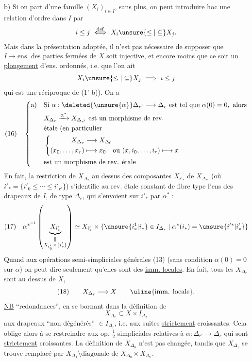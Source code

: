 b) Si on part d'une famille $(X_i)_{i\in I}$,  sans
plus, on peut introduire  hoc une relation
d'ordre dans $I$ par 
\[
i\leq j\ \overset{\mathrm{def}}{\Longleftrightarrow}\ X_i\unsure{\leq|\subseteq}X_j.
\]
Mais dans la présentation adoptée, il n'est pas
nécessaire de supposer que  $I\longrightarrow\text{ens. des parties}$
fermées de $X$ soit injective, et encore moins
que ce soit un \uline{plongement} d'ens. ordonnés,
i.e. que l'on ait
\[
X_i\unsure{\leq|\subseteq}X_j\ \Longrightarrow\ i\leq j
\]
qui est une réciproque de (1' b)).
On a
\[
(16)\quad\left\{\begin{aligned}
\text{a)}\quad&\text{Si }\alpha:\deleted{\unsure{\alpha}}\Delta_{r'}\longrightarrow\Delta_r\text{ est tel que }\alpha(0)=0,\text{ alors}\\
&X_{\Delta_r}\xrightarrow{\alpha^*}X_{\Delta_{r'}}\text{ est un morphisme de rev.}\\
&\text{étale (en particulier}\\
&\left\{\begin{aligned}
X_{\Delta_r}&\longrightarrow X_{\Delta_0}\\
(x_0,\ldots,x_r)&\longmapsto x_0\quad\text{ou }(x,i_0,\ldots,i_r)\longmapsto x
\end{aligned}\right.\\
&\text{est un morphisme de rev. étale}
\end{aligned}\right.
\]
En fait, la  restriction de $X_{\Delta_r}$ au
dessus des composantes $X_{i'_*}$  de $X_{\Delta_{r'}}$
(où $i'_* = \{i'_0\leq\cdots\leq i'_{r'}\}$)  s'identifie
au rev. étale constant de fibre type l'ens
des drapeaux  de $I$, de type $\Delta_r$, qui
s'envoient sur $i'_*$ par $\alpha^*$ :
\[
(17)\quad\alpha^{*^{-1}}\left(\underbrace{X_{i'_*}}_{\substack{\Vert\\X_{i'_0}\times\{i'_*\}}}\right)
\simeq X_{i'_*}\times\{\unsure{i^1_*|i_*}\in I_{\Delta_r}\mid\alpha^*(i_*)=\unsure{i'{}^*|i'_*}\}
\]
Quand aux opérations semi-simpliciales
générales (13) (sans condition $\alpha(0)=0$ sur
$\alpha$) on peut dire seulement qu'elles sont
des \uline{imm. locales}. En fait, tous les
$X_{\Delta_r}$ sont au dessus de $X$, 
\[
(18)\qquad X_{\Delta_r}\longrightarrow X\qquad\text{\uline{imm. locale}}.
\]
\uline{NB} 
``redondances'', en se bornant dans la
définition de
\[
X_{\Delta_r}\subset X\times I_{\Delta_r}
\]
aux drapeaux ``non dégénérés'' $\in I_{\Delta_r}$,
i.e. aux suites \uline{strictement} croissantes. Cela
oblige alors à se restreindre aux op.
$\frac12$ simpliciales relatives à  $\alpha:\Delta_{r'}\longrightarrow\Delta_r$ qui
sont \uline{strictement} croissantes. La définition
de $X_{\Delta_0}$ n'est pas changée, tandis que
$X_{\Delta_1}$ se trouve remplacé par $X_{\Delta_1}\setminus\text{diagonale}$
de $X_{\Delta_0}\times X_{\Delta_0}$.

